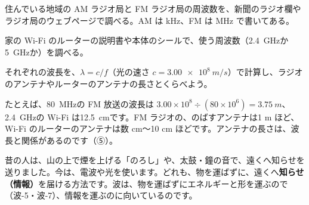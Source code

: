 \begin{yattemiyou}
\begin{enumerate}[label={\bkcircled[bkGreen]{\arabic*}}, leftmargin=2.4\zw, itemsep=1pt, topsep=2pt]
\item 住んでいる地域の AM ラジオ局と FM ラジオ局の周波数を、新聞のラジオ欄やラジオ局のウェブページで調べる。AM は kHz、FM は MHz で書いてある。
\item 家の Wi-Fi のルーターの説明書や本体のシールで、使う周波数（\qty{2.4}{GHz}か\qty{5}{GHz}か）を調べる。
\item それぞれの波長を、$\lambda=c/f$（光の速さ $c=\qty{3.00e8}{m/s}$）で計算し、ラジオのアンテナやルーターのアンテナの長さとくらべよう。
\end{enumerate}
\end{yattemiyou}

\noindent たとえば、\qty{80}{MHz}の FM 放送の波長は $3.00\times10^8\div(80\times10^6)=\qty{3.75}{m}$、\qty{2.4}{GHz}の Wi-Fi は\qty{12.5}{cm}です。FM ラジオの、のばすアンテナは1 m ほど、Wi-Fi のルーターのアンテナは数 cm〜10 cm ほどです。アンテナの長さは、波長と関係があるのです（⑤）。

\begin{omoidasou}
\end{omoidasou}


\leavevmode\label{ph:波-14:sec1}昔の人は、山の上で煙を上げる「のろし」や、太鼓・鐘の音で、遠くへ知らせを送りました。今は、電波や光を使います。どれも、物を運ばずに、遠くへ\textbf{知らせ（情報）}を届ける方法です。波は、物を運ばずにエネルギーと形を運ぶので（波-5・波-7）、情報を運ぶのに向いているのです。

